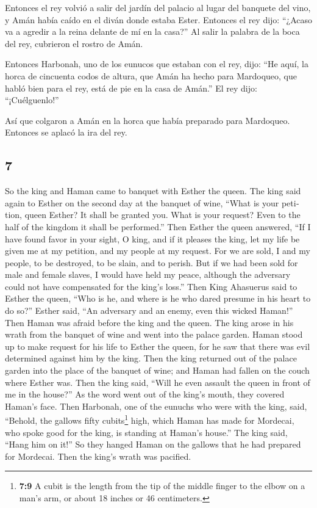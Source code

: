 \begin{paracol}{2}
 Entonces el rey volvió a salir del jardín del palacio al
lugar del banquete del vino, y Amán había caído en el diván donde estaba
Ester. Entonces el rey dijo: ``¿Acaso va a agredir a la reina delante de
mí en la casa?'' Al salir la palabra de la boca del rey, cubrieron el
rostro de Amán.

 Entonces Harbonah, uno de los eunucos que estaban con el
rey, dijo: ``He aquí, la horca de cincuenta codos de altura, que Amán ha
hecho para Mardoqueo, que habló bien para el rey, está de pie en la casa
de Amán.'' El rey dijo: ``¡Cuélguenlo!''

 Así que colgaron a Amán en la horca que había preparado
para Mardoqueo. Entonces se aplacó la ira del rey.

\switchcolumn
\begin{otherlanguage}{english}

\hypertarget{section-13}{%
\section{7}\label{section-13}}

 So the king and Haman came to banquet with Esther the
queen.  The king said again to Esther on the second day at
the banquet of wine, ``What is your petition, queen Esther? It shall be
granted you. What is your request? Even to the half of the kingdom it
shall be performed.''  Then Esther the queen answered,
``If I have found favor in your sight, O king, and if it pleases the
king, let my life be given me at my petition, and my people at my
request.  For we are sold, I and my people, to be
destroyed, to be slain, and to perish. But if we had been sold for male
and female slaves, I would have held my peace, although the adversary
could not have compensated for the king's loss.''  Then
King Ahasuerus said to Esther the queen, ``Who is he, and where is he
who dared presume in his heart to do so?''  Esther said,
``An adversary and an enemy, even this wicked Haman!'' Then Haman was
afraid before the king and the queen.  The king arose in
his wrath from the banquet of wine and went into the palace garden.
Haman stood up to make request for his life to Esther the queen, for he
saw that there was evil determined against him by the king.
 Then the king returned out of the palace garden into the
place of the banquet of wine; and Haman had fallen on the couch where
Esther was. Then the king said, ``Will he even assault the queen in
front of me in the house?'' As the word went out of the king's mouth,
they covered Haman's face.  Then Harbonah, one of the
eunuchs who were with the king, said, ``Behold, the gallows fifty
cubits\footnote{\textbf{7:9} A cubit is the length from the tip of the
  middle finger to the elbow on a man's arm, or about 18 inches or 46
  centimeters.} high, which Haman has made for Mordecai, who spoke good
for the king, is standing at Haman's house.'' The king said, ``Hang him
on it!''  So they hanged Haman on the gallows that he had
prepared for Mordecai. Then the king's wrath was pacified.


\end{otherlanguage}
\end{paracol}
